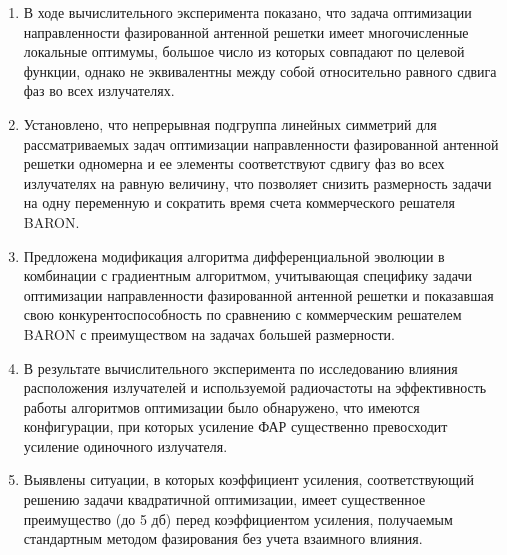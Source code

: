 \begin{enumerate}
  \item В ходе вычислительного эксперимента показано, что задача оптимизации направленности фазированной антенной решетки имеет многочисленные локальные оптимумы, большое число из которых совпадают по целевой функции, однако не эквивалентны между собой относительно равного сдвига фаз во всех излучателях.
  \item Установлено, что непрерывная подгруппа линейных симметрий для рассматриваемых задач оптимизации направленности фазированной антенной решетки одномерна и ее элементы соответствуют сдвигу фаз во всех излучателях на равную величину, что позволяет снизить размерность задачи на одну переменную и сократить время счета коммерческого решателя BARON.
 \item Предложена модификация алгоритма дифференциальной эволюции в комбинации с градиентным алгоритмом, учитывающая специфику задачи оптимизации направленности фазированной антенной решетки и показавшая свою конкурентоспособность по сравнению с коммерческим решателем BARON с преимуществом на задачах большей размерности.
  \item В результате вычислительного эксперимента по исследованию влияния расположения излучателей и используемой радиочастоты на эффективность работы алгоритмов оптимизации было обнаружено, что имеются конфигурации, при которых усиление ФАР существенно превосходит усиление одиночного излучателя.
  \item Выявлены ситуации, в которых коэффициент усиления, соответствующий решению задачи квадратичной оптимизации, имеет существенное преимущество (до 5 дб) перед коэффициентом усиления, получаемым стандартным методом фазирования без учета взаимного влияния.
\end{enumerate}
